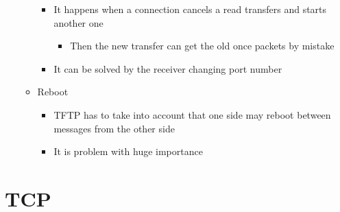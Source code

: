 \documentclass[11pt]{article}
\providecommand{\tightlist}{%
      \setlength{\itemsep}{0pt}\setlength{\parskip}{0pt}}
\begin{document}
\begin{itemize}
\begin{itemize}
    \begin{itemize}
    \tightlist
    \item
      It happens when a connection cancels a read transfers and starts
      another one

      \begin{itemize}
      \tightlist
      \item
        Then the new transfer can get the old once packets by mistake
      \end{itemize}
    \item
      It can be solved by the receiver changing port number
    \end{itemize}
  \item
    Reboot

    \begin{itemize}
    \tightlist
    \item
      TFTP has to take into account that one side may reboot between
      messages from the other side
    \item
      It is problem with huge importance
    \end{itemize}
  \end{itemize}
\end{itemize}

    \section{TCP}\label{tcp}
\end{document}
